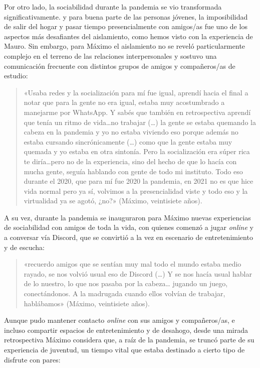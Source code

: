 Por otro lado, la sociabilidad durante la pandemia se vio transformada significativamente. y para buena parte de las personas jóvenes, la imposibilidad de salir del hogar y pasar tiempo presencialmente con amigos/as fue uno de los aspectos más desafiantes del aislamiento, como hemos visto con la experiencia de Mauro. Sin embargo, para Máximo el aislamiento no se reveló particularmente complejo en el terreno de las relaciones interpersonales y sostuvo una comunicación frecuente con distintos grupos de amigos y compañeros/as de estudio:

\begin{quote}
«Usaba redes y la socialización para mí fue igual, aprendí hacia el final a notar que para la gente no era igual, estaba muy acostumbrado a manejarme por WhatsApp. Y sabés que también en retrospectiva aprendí que tenía un ritmo de vida\ldots no trabajar (\ldots) la gente se estaba quemando la cabeza en la pandemia y yo no estaba viviendo eso porque además no estaba cursando sincrónicamente (\ldots) como que la gente estaba muy quemada y yo estaba en otra sintonía. Pero la socialización era súper rica te diría\ldots pero no de la experiencia, sino del hecho de que lo hacía con mucha gente, seguía hablando con gente de todo mi instituto. Todo eso durante el 2020, que para mí fue 2020 la pandemia, en 2021 no es que hice vida normal pero ya sí, volvimos a la presencialidad viste y todo eso y la virtualidad ya se agotó, ¿no?» (Máximo, veintisiete años).
\end{quote}

A su vez, durante la pandemia se inauguraron para Máximo nuevas experiencias de sociabilidad con amigos de toda la vida, con quienes comenzó a jugar \emph{online} y a conversar vía Discord, que se convirtió a la vez en escenario de entretenimiento y de escucha:

\begin{quote}
«recuerdo amigos que se sentían muy mal todo el mundo estaba medio rayado, se nos volvió usual eso de Discord (\ldots) Y se nos hacía usual hablar de lo nuestro, lo que nos pasaba por la cabeza\ldots{} jugando un juego, conectándonos. A la madrugada cuando ellos volvían de trabajar, hablábamos» (Máximo, veintisiete años).
\end{quote}

Aunque pudo mantener contacto \emph{online} con sus amigos y compañeros/as, e incluso compartir espacios de entretenimiento y de desahogo, desde una mirada retrospectiva Máximo considera que, a raíz de la pandemia, se truncó parte de su experiencia de juventud, un tiempo vital que estaba destinado a cierto tipo de disfrute con pares:

